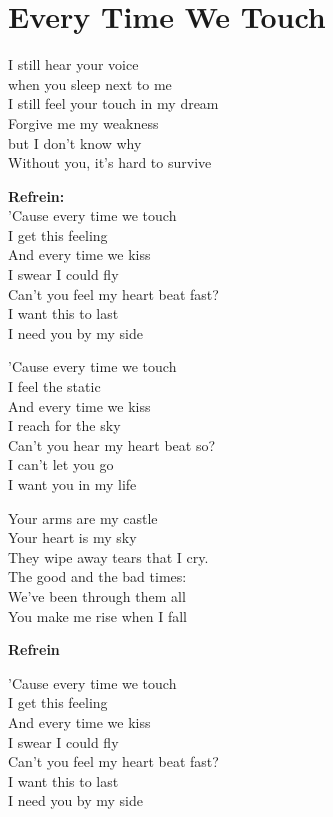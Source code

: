 \section{Every Time We Touch}
I still hear your voice\\
when you sleep next to me\\
I still feel your touch in my dream\\
Forgive me my weakness\\
but I don't know why\\
Without you, it's hard to survive

\textbf{Refrein:}\\
'Cause every time we touch\\
I get this feeling\\
And every time we kiss\\
I swear I could fly\\
Can't you feel my heart beat fast?\\
I want this to last\\
I need you by my side

'Cause every time we touch\\
I feel the static\\
And every time we kiss\\
I reach for the sky\\
Can't you hear my heart beat so?\\
I can't let you go\\
I want you in my life

Your arms are my castle\\
Your heart is my sky\\
They wipe away tears that I cry.\\
The good and the bad times:\\
We've been through them all\\
You make me rise when I fall

\textbf{Refrein}

'Cause every time we touch\\
I get this feeling\\
And every time we kiss\\
I swear I could fly\\
Can't you feel my heart beat fast?\\
I want this to last\\
I need you by my side
